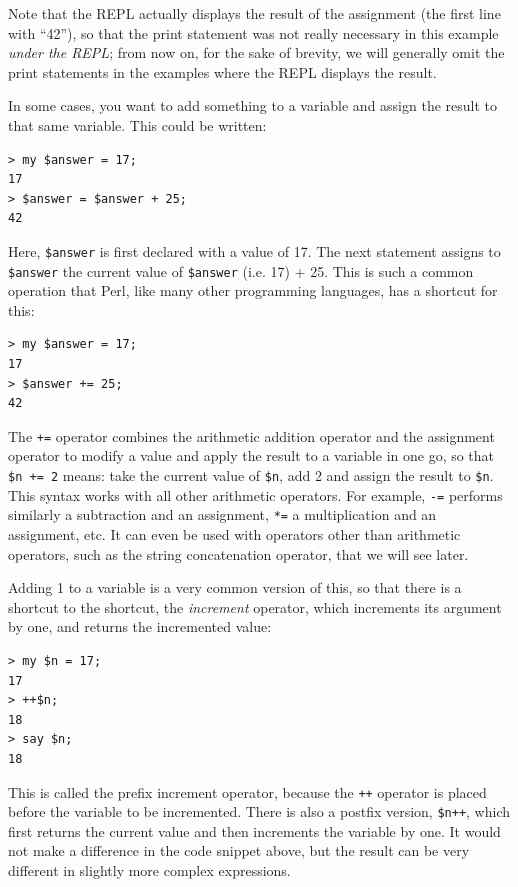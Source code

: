 Note that the REPL actually displays the result of the 
assignment (the first line with ``42''), so that the 
print statement was not really necessary in this 
example \emph{under the REPL}; from now on, for the sake of 
brevity, we will generally omit the print statements in the 
examples where the REPL displays the result.

In some cases, you want to add something to a variable 
and assign the result to that same variable. This could 
be written:

\begin{verbatim}
> my $answer = 17;
17
> $answer = $answer + 25;
42
\end{verbatim}
%

Here, \verb"$answer" is first declared with a value of 17. The next 
statement assigns to \verb"$answer" the current value of 
\verb"$answer" (i.e. 17) + 25. This is such a common operation 
that Perl, like many other programming languages, has a 
shortcut for this:

\begin{verbatim}
> my $answer = 17;
17
> $answer += 25;
42
\end{verbatim}
%

The \verb"+=" operator combines the arithmetic addition operator 
and the assignment operator to modify a value and apply the result 
to a variable in one go, so that \verb"$n += 2" means: take 
the current value of \verb"$n", add 2 and assign the result to 
\verb"$n". This syntax works with all other arithmetic operators. 
For example, \verb"-=" performs similarly a subtraction and an 
assignment, \verb"*=" a multiplication and an assignment, etc. It 
can even be used with operators other than arithmetic operators, 
such as the string concatenation operator, that we will see later.

Adding 1 to a variable is a very common version of this, so that 
there is a shortcut to the shortcut, the \emph{increment} operator, 
which increments its argument by one, and returns the incremented value:

\begin{verbatim}
> my $n = 17;
17
> ++$n;
18
> say $n;
18
\end{verbatim}
%
This is called the prefix increment operator, because the \verb"++" 
operator is placed before the variable to be incremented. There is 
also a postfix version, \verb"$n++", which first returns the current 
value and then increments the variable by one. It would not make 
a difference in the code snippet above, but the result can be very different 
in slightly more complex expressions. 

